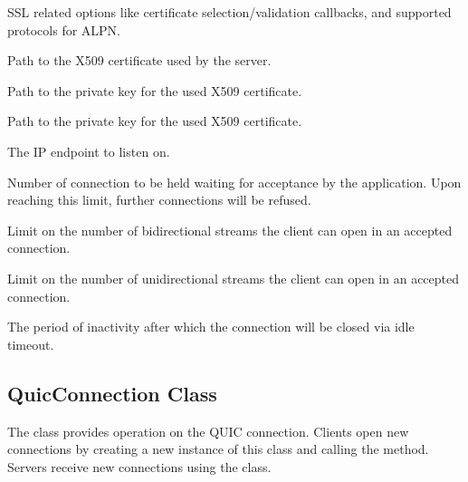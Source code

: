 \begin{description}

        SSL related options like certificate selection/validation callbacks, and supported protocols for ALPN\@.

     Path to the X509 certificate used by the server.

     Path to the private key for the used X509 certificate.

     Path to the private key for the used X509 certificate.

     The IP endpoint to listen on.

     Number of connection to be held waiting for acceptance by the application. Upon reaching this limit, further connections will be refused.

     Limit on the number of bidirectional streams the client can open in an accepted connection.

     Limit on the number of unidirectional streams the client can open in an accepted connection.

     The period of inactivity after which the connection will be closed via idle timeout.

\end{description}

\subsection{QuicConnection Class}

The \QuicConnection{} class provides operation on the QUIC connection. Clients open new
connections by creating a new instance of this class and calling the  method.
Servers receive new connections using the  class.

